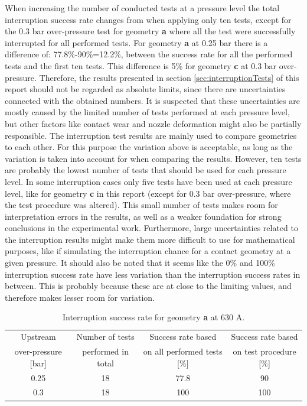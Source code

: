 \documentclass[10pt,b5paper,twoside]{article}
\begin{document}
When increasing the number of conducted tests at a pressure level the total interruption success rate changes from when applying only ten tests, except for the 0.3 bar over-pressure test for geometry \textbf{a} where all the test were successfully interrupted for all performed tests. For geometry \textbf{a} at 0.25 bar there is a difference of: 77.8\%-90\%=12.2\%, between the success rate for all the performed tests and the first ten tests. This difference is 5\% for geometry \textbf{c} at 0.3 bar over-pressure. Therefore, the results presented in section \ref{sec:interruptionTests} of this report should not be regarded as absolute limits, since there are uncertainties connected with the obtained numbers. It is suspected that these uncertainties are mostly caused by the limited number of tests performed at each pressure level, but other factors like contact wear and nozzle deformation might also be partially responsible. The interruption test results are mainly used to compare geometries to each other. For this purpose the variation above is acceptable, as long as the variation is taken into account for when comparing the results. However, ten tests are probably the lowest number of tests that should be used for each pressure level. In some interruption cases only five tests have been used at each pressure level, like for geometry \textbf{c} in this report (except for 0.3 bar over-pressure, where the test procedure was altered). This small number of tests makes room for interpretation errors in the results, as well as a weaker foundation for strong conclusions in the experimental work. Furthermore, large uncertainties related to the interruption results might make them more difficult to use for mathematical purposes, like if simulating the interruption chance for a contact geometry at a given pressure. It should also be noted that it seems like the 0\% and 100\% interruption success rate have less variation than the interruption success rates in between. This is probably because these are at close to the limiting values, and therefore makes lesser room for variation.

\begin{table}[H]
\center
\caption{Interruption success rate for geometry \textbf{a} at 630 A.}
\begin{tabular}{|c|c|c|c|}
\hline 
Upstream & Number of tests & Success rate based & Success rate based \\ over-pressure [bar] &  performed in total &  on all performed tests [\%] &  on test procedure [\%] \\ 
\hline 
0.25 & 18 & 77.8 & 90 \\ 
\hline 
0.3 & 18 & 100 & 100 \\ 
\hline 
\end{tabular} 
\label{tab:successrate1}
\end{table}
\end{document}
